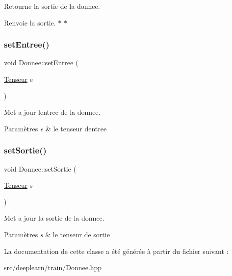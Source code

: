 Retourne la sortie de la donnee. 

\begin{DoxyReturn}{Renvoie}
la sortie. $\ast$ $\ast$ 
\end{DoxyReturn}
\mbox{\label{classDonnee_ad8f000cbd829b3f3485cc158b5a92514}} 
\subsubsection{\texorpdfstring{set\+Entree()}{setEntree()}}
{\footnotesize\ttfamily void Donnee\+::set\+Entree (\begin{DoxyParamCaption}\item[{\hyperlink{classTenseur}{Tenseur}}]{e }\end{DoxyParamCaption})}



Met a jour l\textquotesingle{}entree de la donnee. 


\begin{DoxyParams}{Paramètres}
{\em e} & le tenseur d\textquotesingle{}entree \\
\hline
\end{DoxyParams}
\mbox{\label{classDonnee_adbcb8dc22a69b7c0fffca3dbbef4623b}} 
\subsubsection{\texorpdfstring{set\+Sortie()}{setSortie()}}
{\footnotesize\ttfamily void Donnee\+::set\+Sortie (\begin{DoxyParamCaption}\item[{\hyperlink{classTenseur}{Tenseur}}]{s }\end{DoxyParamCaption})}



Met a jour la sortie de la donnee. 


\begin{DoxyParams}{Paramètres}
{\em s} & le tenseur de sortie \\
\hline
\end{DoxyParams}


La documentation de cette classe a été générée à partir du fichier suivant \+:\begin{DoxyCompactItemize}
\item 
src/deeplearn/train/Donnee.\+hpp\end{DoxyCompactItemize}
